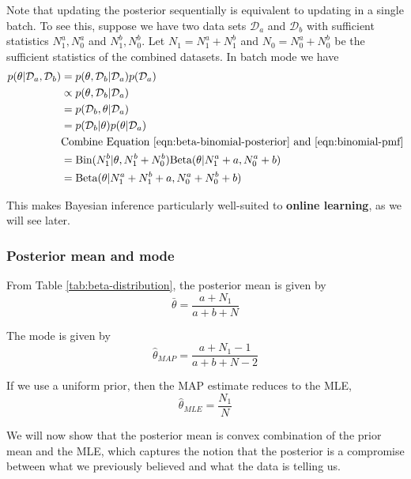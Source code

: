 Note that updating the posterior sequentially is equivalent to updating in a single batch. To see this, suppose we have two data sets $\mathcal{D}_a$ and $\mathcal{D}_b$ with sufficient statistics $N_1^a,N_0^a$ and $N_1^b,N_0^b$. Let $N_1=N_1^a+N_1^b$ and $N_0=N_0^a+N_0^b$ be the sufficient statistics of the combined datasets. In batch mode we have
\begin{align*}
p(\theta|\mathcal{D}_a,\mathcal{D}_b)& = p(\theta,\mathcal{D}_b|\mathcal{D}_a)p(\mathcal{D}_a) \\
               &\propto p(\theta,\mathcal{D}_b|\mathcal{D}_a) \\
               & = p(\mathcal{D}_b,\theta|\mathcal{D}_a) \\
			   & = p(\mathcal{D}_b|\theta)p(\theta|\mathcal{D}_a) \\
			   & \text{Combine Equation \ref{eqn:beta-binomial-posterior} and \ref{eqn:binomial-pmf}} \\
			   & =\text{Bin}(N_1^b|\theta, N_1^b+N_0^b)\text{Beta}(\theta|N_1^a+a,N_0^a+b) \\
			   & =\text{Beta}(\theta|N_1^a+N_1^b+a,N_0^a+N_0^b+b)
\end{align*}

This makes Bayesian inference particularly well-suited to \textbf{online learning}, as we will see later.

\subsubsection{Posterior mean and mode}
\label{sec:beta-binomial-Posterior-mean-and-mode}
From Table \ref{tab:beta-distribution}, the posterior mean is given by
\begin{equation}
\bar{\theta}=\dfrac{a+N_1}{a+b+N}
\end{equation}

The mode is given by
\begin{equation}
\hat{\theta}_{MAP}=\dfrac{a+N_1-1}{a+b+N-2}
\end{equation}

If we use a uniform prior, then the MAP estimate reduces to the MLE,
\begin{equation}
\hat{\theta}_{MLE}=\dfrac{N_1}{N}
\end{equation}

We will now show that the posterior mean is convex combination of the prior mean and the MLE, which captures the notion that the posterior is a compromise between what we previously believed and what the data is telling us.

